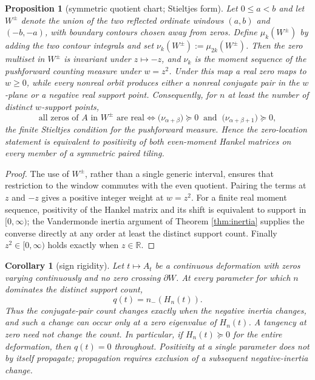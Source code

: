 \documentclass[11pt]{article}
\theoremstyle{plain}
\newtheorem{proposition}[theorem]{Proposition}
\newtheorem{corollary}[theorem]{Corollary}
\theoremstyle{definition}
\theoremstyle{remark}
\newcommand{\R}{\mathbb{R}}
\begin{document}
\begin{proposition}[symmetric quotient chart; Stieltjes form]\label{prop:stieltjes}
Let $0\le a<b$ and let $W^\pm$ denote the union of the two reflected ordinate windows
$(a,b)$ and $(-b,-a)$, with boundary contours chosen away from zeros. Define
$\mu_k(W^\pm)$ by adding the two contour integrals and set
$\nu_k(W^\pm):=\mu_{2k}(W^\pm)$. Then the zero multiset in $W^\pm$ is invariant under
$z\mapsto-z$, and $\nu_k$ is the moment sequence of the pushforward counting measure
under $w=z^2$. Under this map a real zero maps to $w\ge0$, while every nonreal orbit
produces either a nonreal conjugate pair in the $w$-plane or a negative real support
point. Consequently, for $n$ at least the number of distinct $w$-support points,
\[
  \text{all zeros of } A \text{ in } W^\pm \text{ are real}
  \iff
  \bigl(\nu_{\alpha+\beta}\bigr) \succeq 0
  \ \text{ and }\
  \bigl(\nu_{\alpha+\beta+1}\bigr) \succeq 0 ,
\]
the finite Stieltjes condition for the pushforward measure. Hence the zero-location
statement is equivalent to positivity of both even-moment Hankel matrices on every
member of a symmetric paired tiling.
\end{proposition}

\begin{proof}
The use of $W^\pm$, rather than a single generic interval, ensures that restriction to
the window commutes with the even quotient. Pairing the terms at $z$ and $-z$ gives a
positive integer weight at $w=z^2$. For a finite real moment sequence, positivity of
the Hankel matrix and its shift is equivalent to support in $[0,\infty)$; the
Vandermonde inertia argument of Theorem \ref{thm:inertia} supplies the converse directly
at any order at least the distinct support count. Finally $z^2\in[0,\infty)$ holds
exactly when $z\in\R$.
\end{proof}

\begin{corollary}[sign rigidity]\label{cor:rigidity}
Let $t\mapsto A_t$ be a continuous deformation with zeros varying continuously and no
zero crossing $\partial W$. At every parameter for which $n$ dominates the distinct
support count,
\[
 q(t)=n_-(H_n(t)).
\]
Thus the conjugate-pair count changes exactly when the negative inertia changes, and
such a change can occur only at a zero eigenvalue of $H_n(t)$. A tangency at zero need
not change the count. In particular, if $H_n(t)\succeq0$ for the entire deformation,
then $q(t)=0$ throughout. Positivity at a single parameter does not by itself propagate;
propagation requires exclusion of a subsequent negative-inertia change.
\end{corollary}
\end{document}

